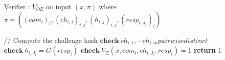 \begin{algorithm}\label{alg_verifier}
	\caption{
		Verifier : $V_{OE}$ on input $(x,\pi) $
		where \newline
		\qquad $\pi =  ( (com_i)_i , (ch_{i,j})_{i,j} , (h_{i,j})_{i,j} , (resp_{i,J_i})_i  )$
	}
	\begin{latin}
	\begin{algorithmic}[1]
		\State // Compute the challenge hash
		\State $ \textbf{check} ~ ch_{i,1} , \cdots ch_{i,m} pairwise distinct $
		\State $ \textbf{check} ~ h_{i,J_i} = G(resp_i) $
		\State $ \textbf{check} ~ V_{\Sigma}(x,com_i,ch_{i,J_i} , resp_i) = 1 $
		\EndFor
		\textbf{return} 1
		\EndIf
		
	\end{algorithmic}
	\end{latin}
\end{algorithm}